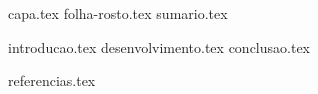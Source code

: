 \documentclass[
	12pt,				%
	oneside,			%
	a4paper,			%
	chapter=TITLE,
	sumario=tradicional,
	english,			%
	brazil				%
]{abntex2}
\begin{document}

\frenchspacing 

{capa.tex}
{folha-rosto.tex}
{sumario.tex}

\textual

\pagestyle{simple}

\begin{OnehalfSpace*}
	
{introducao.tex}
{desenvolvimento.tex}
{conclusao.tex}

\end{OnehalfSpace*}

\postextual

{referencias.tex}
\end{document}
